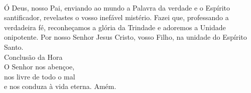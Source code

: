 \documentclass{book}
\begin{document}
\begin{center}
    \vspace{.2cm} \\
    Ó Deus, nosso Pai, enviando ao mundo a Palavra da verdade e o Espírito santificador, revelastes o vosso inefável mistério. Fazei que, professando a verdadeira fé, reconheçamos a glória da Trindade e adoremos a Unidade onipotente. Por nosso Senhor Jesus Cristo, vosso Filho, na unidade do Espírito Santo.
    \vspace{.2cm} \\
    \textcolor{VioletRed2}{Conclusão da Hora}
    \vspace{.2cm} \\
    O Senhor nos abençoe, \\
    nos livre de todo o mal \\
    e nos conduza à vida eterna. Amém.
\end{center}
\end{document}
